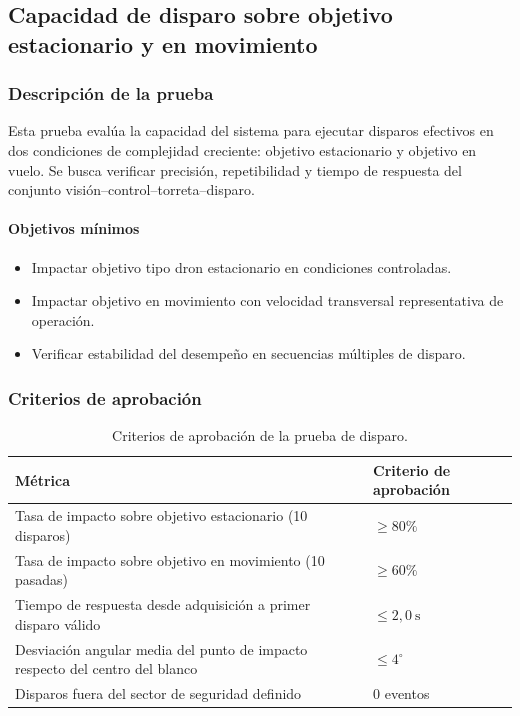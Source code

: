 \subsection{Capacidad de disparo sobre objetivo estacionario y en movimiento}

\subsubsection{Descripción de la prueba}

Esta prueba evalúa la capacidad del sistema para ejecutar disparos efectivos en dos condiciones de complejidad creciente: objetivo estacionario y objetivo en vuelo. Se busca verificar precisión, repetibilidad y tiempo de respuesta del conjunto visión--control--torreta--disparo.

\paragraph{Objetivos mínimos}
\begin{itemize}
    \item Impactar objetivo tipo dron estacionario en condiciones controladas.
    \item Impactar objetivo en movimiento con velocidad transversal representativa de operación.
    \item Verificar estabilidad del desempeño en secuencias múltiples de disparo.
\end{itemize}

\subsubsection{Criterios de aprobación}

\begin{table}[H]
\centering
\small
\begin{tabular}{p{8.8cm} p{4.1cm}}
\toprule
\textbf{Métrica} & \textbf{Criterio de aprobación} \\
\midrule
Tasa de impacto sobre objetivo estacionario (10 disparos) & $\geq 80\%$ \\
Tasa de impacto sobre objetivo en movimiento (10 pasadas) & $\geq 60\%$ \\
Tiempo de respuesta desde adquisición a primer disparo válido & $\leq 2{,}0\ \text{s}$ \\
Desviación angular media del punto de impacto respecto del centro del blanco & $\leq 4^\circ$ \\
Disparos fuera del sector de seguridad definido & 0 eventos \\
\bottomrule
\end{tabular}
\caption{Criterios de aprobación de la prueba de disparo.}
\label{tab:criterios_prueba_disparo}
\end{table}


